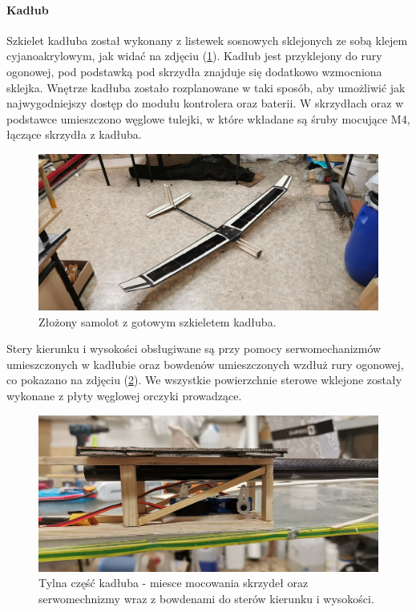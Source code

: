 \documentclass[12pt, a4paper]{article}
\let\oldref\ref
\renewcommand{\ref}[1]{(\oldref{#1})}
\begin{document}
\FloatBarrier
\paragraph{Kadłub}\mbox{}

Szkielet kadłuba został wykonany z listewek sosnowych sklejonych ze sobą klejem cyjanoakrylowym, jak widać na zdjęciu \ref{fig:szkielet}. Kadłub jest przyklejony do rury ogonowej, pod podstawką pod skrzydła znajduje się dodatkowo wzmocniona sklejka. Wnętrze kadłuba zostało rozplanowane w taki sposób, aby umożliwić jak najwygodniejszy dostęp do modułu kontrolera oraz baterii. W skrzydłach oraz w podstawce umieszczono węglowe tulejki, w które wkładane są śruby mocujące M4, łączące skrzydła z kadłuba. 

\begin{figure}[ht]
    \centering
    \includegraphics[width=1\textwidth]{szkielet}
    \caption{Złożony samolot z gotowym szkieletem kadłuba.}
    \label{fig:szkielet}
\end{figure}

Stery kierunku i wysokości obsługiwane są przy pomocy serwomechanizmów umieszczonych w kadłubie oraz bowdenów umieszczonych wzdłuż rury ogonowej, co pokazano na zdjęciu \ref{fig:tyl}. We wszystkie powierzchnie sterowe wklejone zostały wykonane z płyty węglowej orczyki prowadzące. 

\begin{figure}[ht]
    \centering
    \includegraphics[width=1\textwidth]{tyl}
    \caption{Tylna część kadłuba - miesce mocowania skrzydeł oraz serwomechnizmy wraz z bowdenami do sterów kierunku i wysokości.}
    \label{fig:tyl}
\end{figure}
\end{document}
